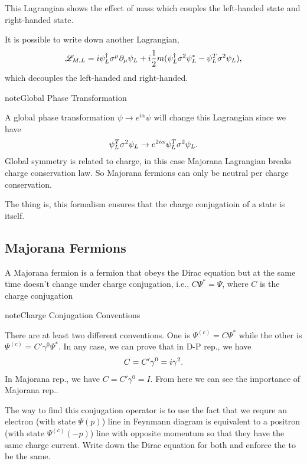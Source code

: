 \documentclass[letterpaper,12pt,english]{sphinxmanual}
\begin{document}
This Lagrangian shows the effect of mass which couples the left-handed state and right-handed state.

It is possible to write down another Lagrangian,
\begin{gather}
\begin{split}\mathscr{L}_{M,L} = i\psi_L^\dagger \sigma^\mu \partial_\mu \psi_L + i \frac{1}{2}m( \psi_L^\dagger \sigma^2 \psi_L^* - \psi_L^T \sigma^2 \psi_L),\end{split}\notag
\end{gather}
which decouples the left-handed and right-handed.

\begin{notice}{note}{Global Phase Transformation}

A global phase transformation \(\psi\to e^{i\alpha} \psi\) will change this Lagrangian since we have
\begin{gather}
\begin{split}\psi_L^T\sigma^2 \psi_L \to e^{2i\alpha}\psi_L^T \sigma^2 \psi_L.\end{split}\notag
\end{gather}
Global symmetry is related to charge, in this case Majorana Lagrangian breaks charge conservation law. So Majorana fermions can only be neutral per charge conservation.
\end{notice}

The thing is, this formalism ensures that the charge conjugatioin of a state is itself.


\subsection{Majorana Fermions}
\label{mass:majorana-fermions}
A Majorana fermion is a fermion that obeys the Dirac equation but at the same time doesn't change under charge conjugation, i.e., \(C \Psi^* = \Psi\), where \(C\) is the charge conjugation

\begin{notice}{note}{Charge Conjugation Conventions}

There are at least two different conventions. One is \(\Psi^{(c)} = C \Psi^*\) while the other is \(\Psi^{(c)} = C'\gamma^0 \Psi^*\). In any case, we can prove that in D-P rep., we have
\begin{gather}
\begin{split}C = C'\gamma^0 = i\gamma^2.\end{split}\notag
\end{gather}
In Majorana rep., we have \(C = C'\gamma^0 = I\). From here we can see the importance of Majorana rep..

The way to find this conjugation operator is to use the fact that we requre an electron (with state \(\Psi(p)\)) line in Feynmann diagram is equivalent to a positron (with state \(\Psi^{(c)}(-p)\)) line with opposite momentum so that they have the same charge current. Write down the Dirac equation for both and enforce the to be the same.
\end{notice}
\end{document}
